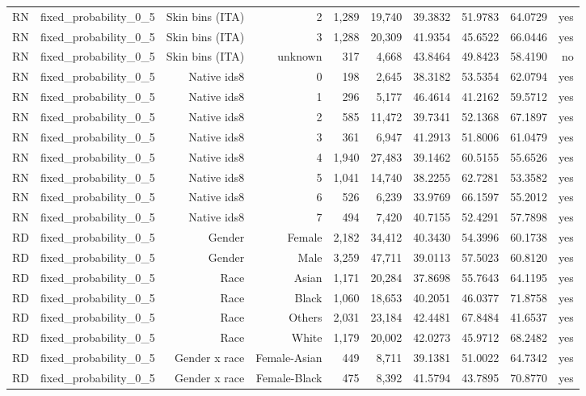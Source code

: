 \documentclass[10pt]{article}
\begin{document}
\begin{longtable}{@{}lrrrrrrrrr@{}}
RN & fixed\_probability\_0\_5 & Skin bins (ITA) & 2 & 1,289 & 19,740 & 39.3832 & 51.9783 & 64.0729 & yes \\
RN & fixed\_probability\_0\_5 & Skin bins (ITA) & 3 & 1,288 & 20,309 & 41.9354 & 45.6522 & 66.0446 & yes \\
RN & fixed\_probability\_0\_5 & Skin bins (ITA) & unknown & 317 & 4,668 & 43.8464 & 49.8423 & 58.4190 & no \\
RN & fixed\_probability\_0\_5 & Native ids8 & 0 & 198 & 2,645 & 38.3182 & 53.5354 & 62.0794 & yes \\
RN & fixed\_probability\_0\_5 & Native ids8 & 1 & 296 & 5,177 & 46.4614 & 41.2162 & 59.5712 & yes \\
RN & fixed\_probability\_0\_5 & Native ids8 & 2 & 585 & 11,472 & 39.7341 & 52.1368 & 67.1897 & yes \\
RN & fixed\_probability\_0\_5 & Native ids8 & 3 & 361 & 6,947 & 41.2913 & 51.8006 & 61.0479 & yes \\
RN & fixed\_probability\_0\_5 & Native ids8 & 4 & 1,940 & 27,483 & 39.1462 & 60.5155 & 55.6526 & yes \\
RN & fixed\_probability\_0\_5 & Native ids8 & 5 & 1,041 & 14,740 & 38.2255 & 62.7281 & 53.3582 & yes \\
RN & fixed\_probability\_0\_5 & Native ids8 & 6 & 526 & 6,239 & 33.9769 & 66.1597 & 55.2012 & yes \\
RN & fixed\_probability\_0\_5 & Native ids8 & 7 & 494 & 7,420 & 40.7155 & 52.4291 & 57.7898 & yes \\
RD & fixed\_probability\_0\_5 & Gender & Female & 2,182 & 34,412 & 40.3430 & 54.3996 & 60.1738 & yes \\
RD & fixed\_probability\_0\_5 & Gender & Male & 3,259 & 47,711 & 39.0113 & 57.5023 & 60.8120 & yes \\
RD & fixed\_probability\_0\_5 & Race & Asian & 1,171 & 20,284 & 37.8698 & 55.7643 & 64.1195 & yes \\
RD & fixed\_probability\_0\_5 & Race & Black & 1,060 & 18,653 & 40.2051 & 46.0377 & 71.8758 & yes \\
RD & fixed\_probability\_0\_5 & Race & Others & 2,031 & 23,184 & 42.4481 & 67.8484 & 41.6537 & yes \\
RD & fixed\_probability\_0\_5 & Race & White & 1,179 & 20,002 & 42.0273 & 45.9712 & 68.2482 & yes \\
RD & fixed\_probability\_0\_5 & Gender x race & Female-Asian & 449 & 8,711 & 39.1381 & 51.0022 & 64.7342 & yes \\
RD & fixed\_probability\_0\_5 & Gender x race & Female-Black & 475 & 8,392 & 41.5794 & 43.7895 & 70.8770 & yes \\

\end{longtable}
\end{document}
